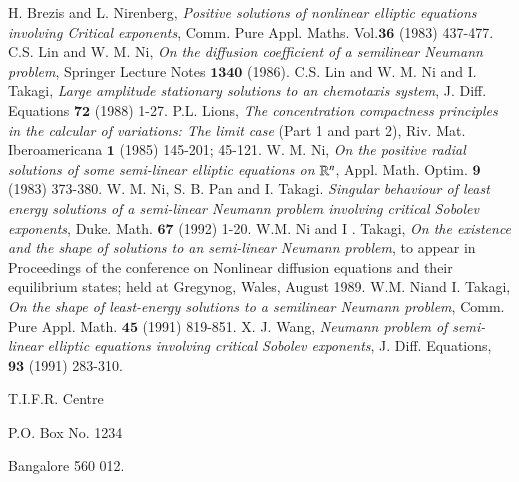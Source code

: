 \begin{thebibliography}{99}
 H. Brezis and L. Nirenberg, \textit{Positive solutions of nonlinear elliptic equations involving Critical exponents}, Comm. Pure Appl. Maths. Vol.${\mathbf{36}}$ (1983) 437-477.
 C.S. Lin and W. M. Ni, \textit{On the diffusion coefficient of a semilinear Neumann problem}, Springer Lecture Notes ${\mathbf{1340}}$ (1986).
 C.S. Lin and W. M. Ni and I. Takagi, \textit{Large amplitude stationary solutions to an chemotaxis system}, J. Diff. Equations ${\mathbf{72}}$ (1988) 1-27.  
 P.L. Lions, \textit{The concentration compactness principles in the calcular of variations: The limit case} (Part 1 and part 2), Riv. Mat. Iberoamericana ${\mathbf{1}}$ (1985) 145-201; 45-121.
 W. M. Ni, \textit{On the positive radial solutions of some semi-linear elliptic equations on} $\mathbb{R}^{n}$, Appl. Math. Optim. ${\mathbf{9}}$ (1983) 373-380.
 W. M. Ni, S. B. Pan and I. Takagi. \textit{Singular behaviour of least energy solutions of a semi-linear Neumann problem involving critical Sobolev exponents}, Duke. Math. ${\mathbf{67}}$ (1992) 1-20.
 W.M. Ni and I . Takagi, \textit{On the existence and the shape of solutions to an semi-linear Neumann problem}, to appear in Proceedings of the conference on Nonlinear diffusion equations and their equilibrium states; held at Gregynog, Wales, August 1989.
 W.M. Ni\pageoriginale and I. Takagi, \textit{On the shape of least-energy solutions to a semilinear Neumann problem}, Comm. Pure Appl. Math. ${\mathbf{45}}$ (1991) 819-851.
 X. J. Wang, \textit{Neumann problem of semi-linear elliptic equations involving critical Sobolev exponents}, J. Diff. Equations, ${\mathbf{93}}$ (1991) 283-310.
\end{thebibliography}

\bigskip

\begin{flushleft}
T.I.F.R. Centre

P.O. Box No. 1234

Bangalore 560 012.
\end{flushleft}
